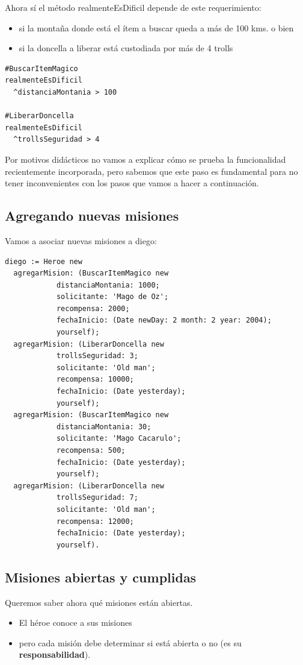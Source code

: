 \documentclass[a4paper,12pt]{book}
\begin{document}
Ahora sí el método realmenteEsDificil depende de este requerimiento:
\begin{itemize}
 \item si la montaña donde está el ítem a buscar queda a más de 100 kms. o bien 
 \item si la doncella a liberar está custodiada por más de 4 trolls
\end{itemize}

\begin{lstlisting}[frame=single]
#BuscarItemMagico
realmenteEsDificil      
  ^distanciaMontania > 100

#LiberarDoncella
realmenteEsDificil      
  ^trollsSeguridad > 4
\end{lstlisting}

Por motivos didácticos no vamos a explicar cómo se prueba la funcionalidad recientemente incorporada, pero
sabemos que este paso es fundamental para no tener inconvenientes con los pasos que vamos a hacer a continuación.

\subsection{Agregando nuevas misiones}
Vamos a asociar nuevas misiones a diego:

\begin{lstlisting}[frame=single]
diego := Heroe new
  agregarMision: (BuscarItemMagico new 
			distanciaMontania: 1000;
			solicitante: 'Mago de Oz';
			recompensa: 2000;
			fechaInicio: (Date newDay: 2 month: 2 year: 2004);
			yourself);
  agregarMision: (LiberarDoncella new 
			trollsSeguridad: 3;
			solicitante: 'Old man';
			recompensa: 10000;
			fechaInicio: (Date yesterday);
			yourself);
  agregarMision: (BuscarItemMagico new 
			distanciaMontania: 30;
			solicitante: 'Mago Cacarulo';
			recompensa: 500;
			fechaInicio: (Date yesterday);
			yourself);
  agregarMision: (LiberarDoncella new 
			trollsSeguridad: 7;
			solicitante: 'Old man';
			recompensa: 12000;
			fechaInicio: (Date yesterday);
			yourself).

\end{lstlisting}

\subsection{Misiones abiertas y cumplidas}
Queremos saber ahora qué misiones están abiertas.
\begin{itemize}
 \item El héroe conoce a sus misiones
 \item pero cada misión debe determinar si está abierta o no (es su \textbf{responsabilidad}). 
\end{itemize}
\end{document}
